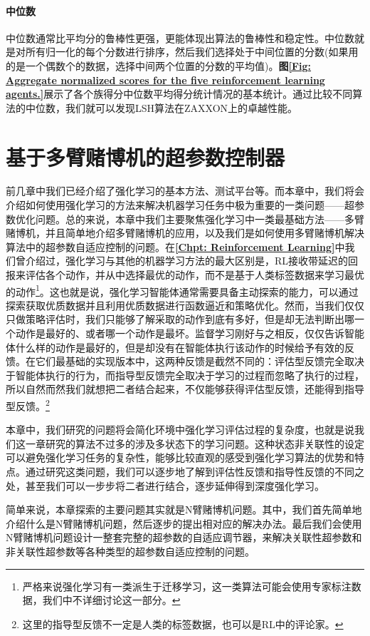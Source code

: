 \subsubsection{中位数}
中位数通常比平均分的鲁棒性更强，更能体现出算法的鲁棒性和稳定性。中位数就是对所有归一化的每个分数进行排序，然后我们选择处于中间位置的分数(如果用的是一个偶数个的数据，选择中间两个位置的分数的平均值)。\textbf{图\ref{Fig: Aggregate normalized scores for the five reinforcement learning agents.}}展示了各个族得分中位数平均得分统计情况的基本统计。通过比较不同算法的中位数，我们就可以发现LSH算法在ZAXXON上的卓越性能。
\chapter{基于多臂赌博机的超参数控制器}
\label{Chpt: auto-ml}

前几章中我们已经介绍了强化学习的基本方法、测试平台等。而本章中，我们将会介绍如何使用强化学习的方法来解决机器学习任务中极为重要的一类问题——超参数优化问题。总的来说，本章中我们主要聚焦强化学习中一类最基础方法——多臂赌博机，并且简单地介绍多臂赌博机的应用，以及我们是如何使用多臂赌博机解决算法中的超参数自适应控制的问题。在\textbf{\ref{Chpt: Reinforcement Learning}}中我们曾介绍过，强化学习与其他的机器学习方法的最大区别是，RL接收带延迟的回报来评估各个动作，并从中选择最优的动作，而不是基于人类标签数据来学习最优的动作\footnote{严格来说强化学习有一类派生于迁移学习，这一类算法可能会使用专家标注数据，我们中不详细讨论这一部分。}。这也就是说，强化学习智能体通常需要具备主动探索的能力，可以通过探索获取优质数据并且利用优质数据进行函数逼近和策略优化。然而，当我们仅仅只做策略评估时，我们只能够了解采取的动作到底有多好，但是却无法判断出哪一个动作是最好的、或者哪一个动作是最坏。监督学习刚好与之相反，仅仅告诉智能体什么样的动作是最好的，但是却没有在智能体执行该动作的时候给予有效的反馈。在它们最基础的实现版本中，这两种反馈是截然不同的：评估型反馈完全取决于智能体执行的行为，而指导型反馈完全取决于学习的过程而忽略了执行的过程，所以自然而然我们就想把二者结合起来，不仅能够获得评估型反馈，还能得到指导型反馈。\footnote{这里的指导型反馈不一定是人类的标签数据，也可以是RL中的评论家。}

本章中，我们研究的问题将会简化环境中强化学习评估过程的复杂度，也就是说我们这一章研究的算法不过多的涉及多状态下的学习问题。这种状态非关联性的设定可以避免强化学习任务的复杂性，能够比较直观的感受到强化学习算法的优势和特点。通过研究这类问题，我们可以逐步地了解到评估性反馈和指导性反馈的不同之处，甚至我们可以一步步将二者进行结合，逐步延伸得到深度强化学习。

简单来说，本章探索的主要问题其实就是N臂赌博机问题。其中，我们首先简单地介绍什么是N臂赌博机问题，然后逐步的提出相对应的解决办法。最后我们会使用N臂赌博机问题设计一整套完整的超参数的自适应调节器，来解决关联性超参数和非关联性超参数等各种类型的超参数自适应控制的问题。

